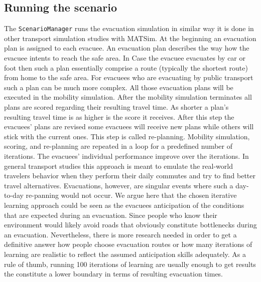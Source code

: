 \subsection{Running the scenario}
The \verb+ScenarioManager+ runs the evacuation simulation in similar way it is done in other transport simulation studies with MATSim. 
At the beginning an evacuation plan is assigned to each evacuee. 
An evacuation plan describes the way how the evacuee intents to reach the safe area.
In Case the evacuee evacuates by car or foot then such a plan essentially comprise a route (typically the shortest route) from home to the safe area. For evacuees who are evacuating by public transport such a plan can be much more complex. All those evacuation plans will be executed in the mobility simulation. After the mobility simulation terminates all plans are scored regarding their resulting travel time. 
As shorter a plan's resulting travel time is as higher is the score it receives. After this step the evacuees' plans are revised some evacuees will receive new plans while others will stick with the current ones. This step is called re-planning. Mobility simulation, scoring, and re-planning are repeated in a loop for a predefined number of iterations. The evacuees' individual performance improve over the iterations. 
In general transport studies this approach is meant to emulate the real-world travelers behavior when they perform their daily commutes and try to find better travel alternatives. Evacuations, however, are singular events where such a day-to-day re-panning would not occur. We argue here that the chosen iterative learning approach could be seen as the evacuees anticipation of the conditions that are expected during an evacuation. 
Since people who know their  environment would likely avoid roads that obviously constitute bottlenecks during an evacuation. Nevertheless, there is more research needed in order to get a definitive answer how people choose evacuation routes or how many iterations of learning are realistic to reflect the assumed anticipation skills adequately. As a rule of thumb, running 100 iterations of learning are usually enough to get results the constitute a lower boundary in terms of resulting evacuation times.

